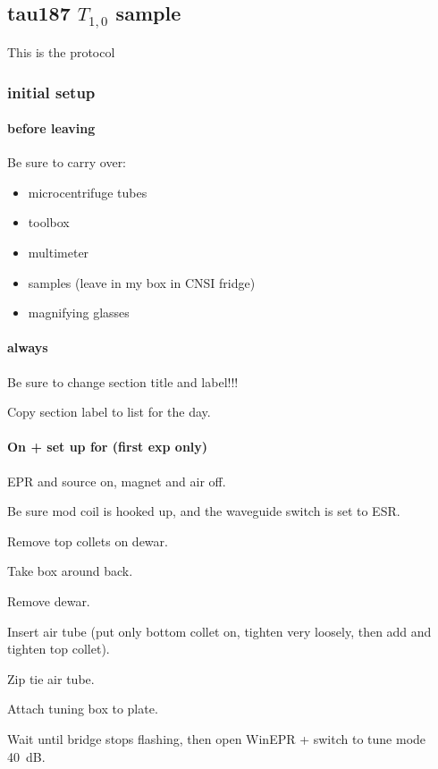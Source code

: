 \subsection{tau187 $T_{1,0}$ sample}\label{sec:biol_tau_unlabeled}
\timeblockstart
{}
This is the protocol

\subsubsection{initial setup}
\paragraph{before leaving}
Be sure to carry over:
\begin{itemize}
    \item microcentrifuge tubes
    \item toolbox 
    \item multimeter 
    \item samples (leave in my box in CNSI fridge)
    \item magnifying glasses
\end{itemize}

\paragraph{always}
Be sure to change section title and label!!!

Copy section label to list for the day.

\paragraph{On + set up for (first exp only)}

EPR and source on, magnet and air off.

Be sure mod coil is hooked up, and the waveguide switch is set to ESR.

Remove top collets on dewar.

Take box around back.

Remove dewar.

Insert air tube (put only bottom collet on, tighten very loosely, then add and tighten top collet).

Zip tie air tube.

Attach tuning box to plate.

Wait until bridge stops flashing, then open WinEPR + switch to tune mode 40~dB.


